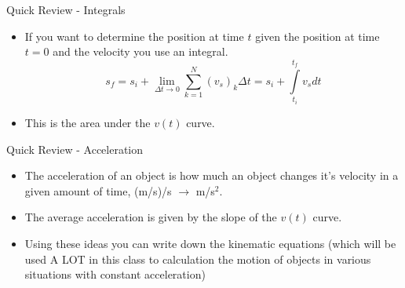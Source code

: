 \documentclass{beamer}
\begin{document}
\begin{frame}{Quick Review - Integrals}
\begin{itemize}
   \item<1-> If you want to determine the position at time $t$ given the position at time $t=0$ and the velocity you use an integral.
   \begin{equation*}
      s_f = s_i + \lim\limits_{\Delta t \rightarrow 0} \sum\limits_{k=1}^N (v_s)_k\Delta t = s_i + \int\limits_{t_i}^{t_f}v_s dt
   \end{equation*}
   \item<3-> This is the area under the $v(t)$ curve.
\end{itemize}
\end{frame}

\begin{frame}{Quick Review - Acceleration}
\begin{itemize}
   \item<1-> The acceleration of an object is how much an object changes it's velocity in a given amount of time, (m/s)/s $\rightarrow$ m/s$^2$.
   \item<2->The average acceleration is given by the slope of the $v(t)$ curve.
   \item<3-> Using these ideas you can write down the kinematic equations (which will be used A LOT in this class to calculation the motion of objects in various situations with constant acceleration)
\end{itemize}
\end{frame}
\end{document}
